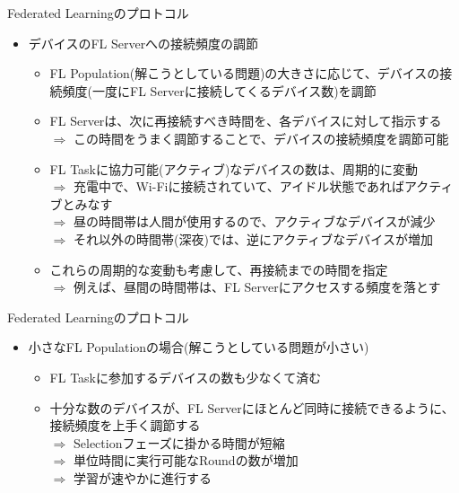 \documentclass[dvipdfmx,notheorems,t]{beamer}
\begin{document}
\begin{frame}{Federated Learningのプロトコル}

\begin{itemize}
	\item デバイスのFL Serverへの接続頻度の調節
	\begin{itemize}
		\item FL Population(解こうとしている問題)の大きさに応じて、デバイスの接続頻度(一度にFL Serverに接続してくるデバイス数)を調節
		\newline
		
		\item FL Serverは、次に再接続すべき時間を、各デバイスに対して指示する \\
		$\Rightarrow$ この時間をうまく調節することで、デバイスの接続頻度を調節可能
		\newline
		
		\item FL Taskに協力可能(\alert{アクティブ})なデバイスの数は、周期的に変動 \\
		$\Rightarrow$ 充電中で、Wi-Fiに接続されていて、アイドル状態であればアクティブとみなす \\
		$\Rightarrow$ 昼の時間帯は人間が使用するので、アクティブなデバイスが減少 \\
		$\Rightarrow$ それ以外の時間帯(深夜)では、逆にアクティブなデバイスが増加
		\newline
		
		\item これらの周期的な変動も考慮して、再接続までの時間を指定 \\
		$\Rightarrow$ 例えば、昼間の時間帯は、FL Serverにアクセスする頻度を落とす
	\end{itemize}
\end{itemize}

\end{frame}

\begin{frame}{Federated Learningのプロトコル}

\begin{itemize}	
	\item 小さなFL Populationの場合(解こうとしている問題が小さい)
	\begin{itemize}
		\item FL Taskに参加するデバイスの数も少なくて済む
		\newline
		
		\item 十分な数のデバイスが、FL Serverにほとんど同時に接続できるように、接続頻度を上手く調節する \\
		$\Rightarrow$ Selectionフェーズに掛かる時間が短縮 \\
		$\Rightarrow$ 単位時間に実行可能なRoundの数が増加 \\
		$\Rightarrow$ 学習が速やかに進行する
	\end{itemize}
\end{itemize}

\end{frame}
\end{document}
